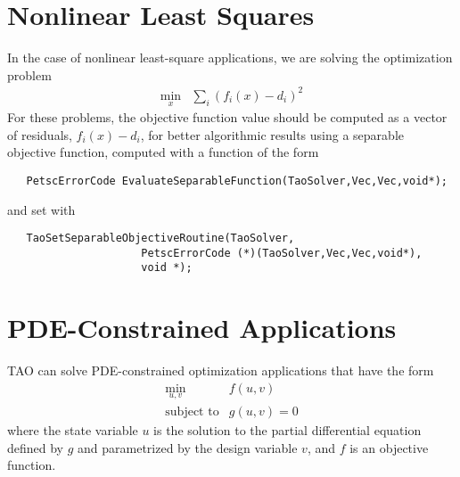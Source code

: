 \section{Nonlinear Least Squares}\label{sec:evalsof}
In the case of nonlinear least-square applications, we are solving
the optimization problem
\[
\begin{array}{ll}
\displaystyle \min_{x} & \displaystyle \sum_i (f_i(x) - d_i)^2
\end{array}
\]
For these problems, the objective function value should be computed as a 
vector of residuals, $f_i(x) - d_i$, for better algorithmic results using 
a separable objective function, computed with a function of the form
\begin{verbatim}
   PetscErrorCode EvaluateSeparableFunction(TaoSolver,Vec,Vec,void*);
\end{verbatim}
and set with
\begin{verbatim}
   TaoSetSeparableObjectiveRoutine(TaoSolver,
                     PetscErrorCode (*)(TaoSolver,Vec,Vec,void*),
                     void *);
\end{verbatim}

\begin{comment}
The computation of the Jacobian of the separable objective routine 
should be in a routine that looks like
\begin{verbatim}
   PetscErrorCode EvaluateJacobian(TaoSolver,Vec,Mat*,Mat*,MatStructure*,
                     void*);
\end{verbatim}
This function can be registered with TAO using the function
\begin{verbatim}
   TaoSetJacobianRoutine(TaoSolver,Mat J, Mat Jpre,
                     PetscErrorCode (*)(TaoSolver,Vec,Mat*,Mat*,
                     MatStructure*,void*), void *);
\end{verbatim}
The first argument is the TAO solver object, the second and third arguments
are the Mat object where the Jacobian will be stored and the Mat object
that will be used for the preconditioning (they may be the same). The fourth 
argument is the function that evaluates the Jacobian, 
and the fifth argument is a pointer to a user defined context,
cast as a {\tt void*} pointer.
\end{comment}

\section{PDE-Constrained Applications}\label{sec:pde_applications}
TAO can solve PDE-constrained optimization applications 
that have the form
\[
\begin{array}{ll}
\displaystyle \min_{u,v} & f(u,v) \\
\mbox{subject to} & g(u,v) = 0
\end{array}
\]
where the state variable $u$ is the solution to the partial differential 
equation defined by $g$ and parametrized by the design variable $v$, and 
$f$ is an objective function.  


